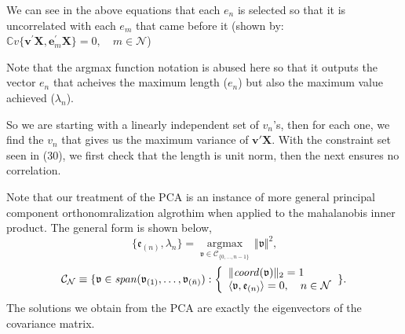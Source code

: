\documentclass[../main.tex]{subfiles}
\begin{document}
\par We can see in the above equations that 
each $e_n$ is selected so that it is uncorrelated with each $e_m$ 
that came before it (shown by: $\mathbb{C}v\{\boldsymbol{v}^{\prime}\boldsymbol{X},\boldsymbol{e}_{m}^{\prime}\boldsymbol{X}\}=0, \quad m\in\mathcal{N}$)
\par Note that the argmax function notation is abused here so that 
it outputs the vector $e_n$ that acheives the maximum length ($e_n$)
but also the maximum value achieved ($\lambda_n$).
\par So we are starting with a linearly independent set of $v_n$'s, then for each one, we find the $v_n$ that gives us the maximum 
variance of $\mathbf{v'}\mathbf{X}$. With the constraint set seen in (30), we first check 
that the length is unit norm, then the next ensures no correlation. 
\par Note that our treatment of the PCA is an instance of more general
principal component orthonomralization algrothim when applied to the mahalanobis inner product. 
The general form is shown below,  
\begin{equation}
    \{\mathfrak{e}_{(n)},\lambda_{n}\}=\operatorname*{argmax}\limits_{\mathfrak{v}\in\mathcal{C}_{\{0,\ldots,n-1\}}}\,\Vert\mathfrak{v}\Vert^{2}\text{,}
    \end{equation}
    \begin{equation}
        \mathcal{C}_{\mathcal{N}}\equiv\{\mathfrak{v}\in\mathit{span}(\mathfrak{v}_{(1)},\ldots,\mathfrak{v}_{(\bar{n})}):\left\{ \begin{array}
        [c]{l}\Vert\mathit{coord}(\mathfrak{v})\Vert_{2}=1\\
        \langle\mathfrak{v},\mathfrak{e}_{(n)}\rangle=0,\quad n\in\mathcal{N}
        \end{array} \right. \}\text{.}
    \end{equation}
The solutions we obtain from the PCA are exactly the eigenvectors of the covariance matrix. 
\end{document}
